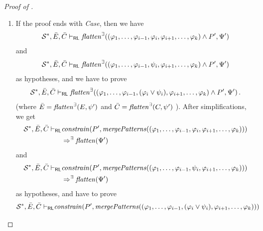 \documentclass{article}
\newcommand{\RL}{\mathsf{RL}}
\begin{document}
\begin{proof}[Proof of ]
\begin{enumerate}
    \item If the proof ends with \emph{Case}, then we have
        \begin{equation*}
            \mathcal{S}^*, \Bar{E}, \Bar{C} \vdash_\RL
            \mathit{flatten}^\exists((\varphi_1, \ldots, \varphi_{i-1}, \varphi_i, \varphi_{i+1}, \ldots, \varphi_k) \land P^\prime, \Psi^\prime)
        \end{equation*}
        and
        \begin{equation*}
            \mathcal{S}^*, \Bar{E}, \Bar{C} \vdash_\RL
            \mathit{flatten}^\exists((\varphi_1, \ldots, \varphi_{i-1}, \psi_i, \varphi_{i+1}, \ldots, \varphi_k) \land P^\prime, \Psi^\prime) 
        \end{equation*}
        as hypotheses, and we have to prove
        \begin{equation*}
            \mathcal{S}^*, \Bar{E}, \Bar{C} \vdash_\RL
            \mathit{flatten}^\exists((\varphi_1, \ldots, \varphi_{i-1}, (\varphi_i \lor \psi_i), \varphi_{i+1}, \ldots, \varphi_k) \land P^\prime, \Psi^\prime)               \, .
        \end{equation*}
        (where $\Bar{E} = \mathit{flatten}^\exists(E, \psi^\prime)$
         and $\Bar{C} = \mathit{flatten}^\exists(C, \psi^\prime)$
        ).
        After simplifications, we get
        \begin{align*}
            \mathcal{S}^*, \Bar{E}, \Bar{C} \vdash_\RL
            &
            \mathit{constrain}(P^\prime, \mathit{mergePatterns}((\varphi_1, \ldots, \varphi_{i-1}, \varphi_i, \varphi_{i+1}, \ldots, \varphi_k)))
            \\ & \Rightarrow^\exists
            \mathit{flatten}(\Psi^\prime)
        \end{align*}
        and
        \begin{align*}
            \mathcal{S}^*, \Bar{E}, \Bar{C} \vdash_\RL
            &
            \mathit{constrain}(P^\prime, \mathit{mergePatterns}((\varphi_1, \ldots, \varphi_{i-1}, \psi_i, \varphi_{i+1}, \ldots, \varphi_k)))
            \\ & \Rightarrow^\exists
            \mathit{flatten}(\Psi^\prime)
        \end{align*}
        as hypotheses,
        and have to prove
        \begin{align*}
            \mathcal{S}^*, \Bar{E}, \Bar{C} \vdash_\RL
            &
            \mathit{constrain}(P^\prime, \mathit{mergePatterns}((\varphi_1, \ldots, \varphi_{i-1}, (\varphi_i \lor \psi_i), \varphi_{i+1}, \ldots, \varphi_k)))

\end{align*}
\end{enumerate}
\end{proof}
\end{document}
